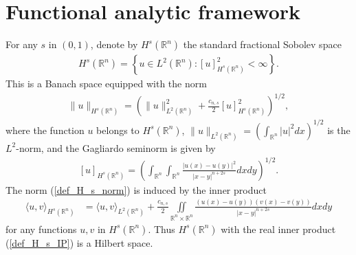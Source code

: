 \documentclass[preprint,12pt]{elsarticle}
\newcommand{\R}{\mathbb R}
\begin{document}
\section{Functional analytic framework}\label{subs_func_an}
For any $s$ in $(0,1)$, denote by $H^s(\R^n)$ the standard fractional Sobolev space
\begin{align}\label{def_std_frac_Sob_sp}
    H^s(\R^n)=\left\{u\in L^2(\R^n): [u]^2_{H^s(\R^n)}<\infty\right\}.
\end{align}
This is a Banach space equipped with the norm 
\begin{align}\label{def_H_s_norm}
    \|u\|_{H^s(\R^n)}=\left(\|u\|^2_{L^2(\R^n)}+\frac{c_{n,s}}{2}[u]^2_{H^s(\R^n)}\right)^{1/2},
\end{align}
where the function $u$ belongs to $H^s(\R^n)$, $\|u\|_{L^2(\R^n)}=\left(\int_{\R^n}|u|^2dx\right)^{1/2}$ is the $L^2$-norm, and the Gagliardo seminorm is given by
\begin{align}\label{def_Gagliardo_seminorm}
    [u]_{H^s(\R^n)}=\left(\int_{\R^n}\int_{\R^n}\frac{|u(x)-u(y)|^2}{|x-y|^{n+2s}}dxdy\right)^{1/2}.
\end{align}
\cite[p. 5]{NPV} The norm (\ref{def_H_s_norm}) is induced by the inner product
\begin{align}\label{def_H_s_IP}
    \langle u,v \rangle_{H^s(\R^n)}&=\langle u, v\rangle_{L^2(\R^n)}+\frac{c_{n,s}}{2}\iint\limits_{\R^n\times\R^n}\frac{(u(x)-u(y))(v(x)-v(y))}{|x-y|^{n+2s}}dxdy
\end{align}
for any functions $u,v$ in $H^s(\R^n)$. Thus $H^s(\R^n)$ with the real inner product (\ref{def_H_s_IP}) is a Hilbert space. %
 
\end{document}
